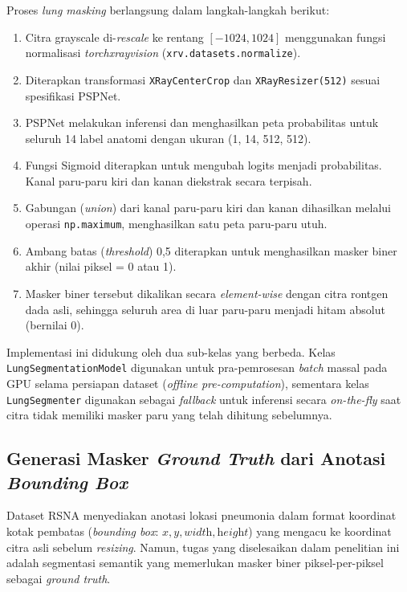 \documentclass[12pt,a4paper,oneside]{book}
\begin{document}
Proses \textit{lung masking} berlangsung dalam langkah-langkah berikut:
\begin{enumerate}
  \item Citra grayscale di-\textit{rescale} ke rentang $[-1024, 1024]$ menggunakan fungsi normalisasi \textit{torchxrayvision} (\texttt{xrv.datasets.normalize}).
  \item Diterapkan transformasi \texttt{XRayCenterCrop} dan \texttt{XRayResizer(512)} sesuai spesifikasi PSPNet.
  \item PSPNet melakukan inferensi dan menghasilkan peta probabilitas untuk seluruh 14 label anatomi dengan ukuran (1, 14, 512, 512).
  \item Fungsi Sigmoid diterapkan untuk mengubah logits menjadi probabilitas. Kanal paru-paru kiri dan kanan diekstrak secara terpisah.
  \item Gabungan (\textit{union}) dari kanal paru-paru kiri dan kanan dihasilkan melalui operasi \texttt{np.maximum}, menghasilkan satu peta paru-paru utuh.
  \item Ambang batas (\textit{threshold}) 0,5 diterapkan untuk menghasilkan masker biner akhir (nilai piksel = 0 atau 1).
  \item Masker biner tersebut dikalikan secara \textit{element-wise} dengan citra rontgen dada asli, sehingga seluruh area di luar paru-paru menjadi hitam absolut (bernilai 0).
\end{enumerate}

Implementasi ini didukung oleh dua sub-kelas yang berbeda. Kelas \texttt{LungSegmentationModel} digunakan untuk pra-pemrosesan \textit{batch} massal pada GPU selama persiapan dataset (\textit{offline pre-computation}), sementara kelas \texttt{LungSegmenter} digunakan sebagai \textit{fallback} untuk inferensi secara \textit{on-the-fly} saat citra tidak memiliki masker paru yang telah dihitung sebelumnya.

\subsection{Generasi Masker \textit{Ground Truth} dari Anotasi \textit{Bounding Box}}

Dataset RSNA menyediakan anotasi lokasi pneumonia dalam format koordinat kotak pembatas (\textit{bounding box}: $x, y, \textit{width}, \textit{height}$) yang mengacu ke koordinat citra asli sebelum \textit{resizing}. Namun, tugas yang diselesaikan dalam penelitian ini adalah segmentasi semantik yang memerlukan masker biner piksel-per-piksel sebagai \textit{ground truth}.
\end{document}
